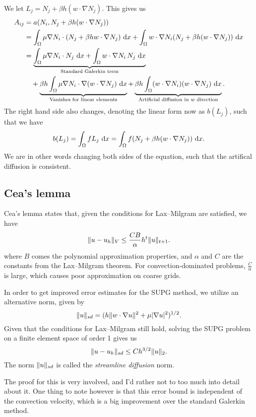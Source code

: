 We let $L_j = N_j + \beta h (w \cdot \nabla N_j)$.
This gives us
\begin{align*}
    A_{ij} &= a(N_i, N_j + \beta h (w \cdot \nabla N_j)) \\
    &= \int_{\Omega} \mu \nabla N_i \cdot (N_j + \beta h w \cdot \nabla N_j) \, \mathop{}\!\mathrm{d} x + \int_{\Omega} w \cdot \nabla N_i (N_j + \beta h (w \cdot \nabla N_j)) \, \mathop{}\!\mathrm{d} x \\
    &= \underbrace{
        \int_{\Omega} \mu \nabla N_i \cdot N_j \, \mathop{}\!\mathrm{d} x
        + \int_{\Omega} w \cdot \nabla N_i \, N_j \, \mathop{}\!\mathrm{d} x
    }_{\text{Standard Galerkin term}} \\
    &\quad + \underbrace{
        \beta h
        \int_{\Omega} \mu \nabla N_i \cdot \nabla (w \cdot \nabla N_j) \, \mathop{}\!\mathrm{d} x
    }_{\text{Vanishes for linear elements}}
    + \underbrace{
        \beta h
        \int_{\Omega} (w \cdot \nabla N_i) (w \cdot \nabla N_j) \, \mathop{}\!\mathrm{d} x
    }_{\text{Artificial diffusion in $w$ direction}}.
\end{align*}
The right hand side also changes, denoting the linear form now as $b(L_j)$, such that we have
\begin{equation}
    b(L_j)
    = \int_{\Omega} f L_j \, \mathop{}\!\mathrm{d} x
    = \int_{\Omega} f (N_j + \beta h (w \cdot \nabla N_j)) \, \mathop{}\!\mathrm{d} x.
\end{equation}
We are in other words changing both sides of the equation, such that the artifical diffusion is consistent.

\subsection{Cea's lemma}
Cea's lemma states that, given the conditions for Lax--Milgram are satisfied, we have %
\begin{equation}
    \lVert u - u_h\rVert_{V} \leq \frac{C B}{\alpha} h^t \lVert u\rVert_{t + 1}.
\end{equation}
where $B$ comes the polynomial approximation properties, and $\alpha$ and $C$ are the constants from the Lax--Milgram theorem. %
For convection-dominated problems, $\frac{C}{\alpha}$ is large, which causes poor approximation on coarse grids.

In order to get improved error estimates for the SUPG method, we utilize an alternative norm, given by
\begin{equation}
    \lVert u\rVert_{sd} = (h \lVert w \cdot \nabla u\rVert^2 + \mu \lvert\nabla u\rvert^2)^{1/2}.
\end{equation}
Given that the conditions for Lax--Milgram still hold, solving the SUPG problem on a finite element space of order 1 gives us %
\begin{equation}
    \lVert u - u_h\rVert_{sd} \leq C h^{3/2} \lVert u\rVert_2.
\end{equation}
The norm $\lVert u\rVert_{sd}$ is called the \textit{streamline diffusion} norm.

The proof for this is very involved, and I'd rather not to too much into detail about it.
One thing to note however is that this error bound is independent of the convection velocity, which is a big improvement over the standard Galerkin method.
